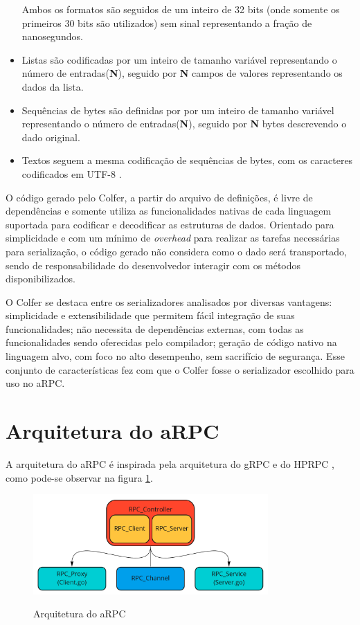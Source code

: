 \begin{itemize}
Ambos os formatos são seguidos de um inteiro de 32 bits (onde somente os primeiros 30 bits são utilizados) sem sinal representando a fração de nanosegundos.

    \item Listas são codificadas por um inteiro de tamanho variável representando o número de entradas(\textbf{N}), seguido por \textbf{N} campos de valores representando os dados da lista.

    \item Sequências de bytes são definidas por por um inteiro de tamanho variável representando o número de entradas(\textbf{N}), seguido por \textbf{N} bytes descrevendo o dado original.

    \item Textos seguem a mesma codificação de sequências de bytes, com os caracteres codificados em UTF-8 \cite{noauthor_unicode_2010}.

\end{itemize}

O código gerado pelo Colfer, a partir do arquivo de definições, é livre de dependências e somente utiliza as funcionalidades nativas de cada linguagem suportada para codificar e decodificar as estruturas de dados.
Orientado para simplicidade e com um mínimo de \textit{overhead} para realizar as tarefas necessárias para serialização, o código gerado não considera como o dado será transportado, sendo de responsabilidade do desenvolvedor interagir com os métodos disponibilizados. 

O Colfer se destaca entre os serializadores analisados por diversas vantagens: simplicidade e extensibilidade que permitem fácil integração de suas funcionalidades; não necessita de dependências externas, com todas as funcionalidades sendo oferecidas pelo compilador; geração de código nativo na linguagem alvo, com foco no alto desempenho, sem sacrifício de segurança. Esse conjunto de características fez com que o Colfer fosse o serializador escolhido para uso no aRPC.

\section{Arquitetura do aRPC}

A arquitetura do aRPC é inspirada pela arquitetura do gRPC e do HPRPC \cite{bagci_lightweight_2016}, como pode-se observar na figura \ref{fig:arpc_arquitetura}. 

\begin{figure}[ht]
    \centering
    \caption{Arquitetura do aRPC}
    \includegraphics[width=0.8\textwidth]{figuras/diagramas/cap3/arquitetura.png} 
    \label{fig:arpc_arquitetura}
\end{figure}

